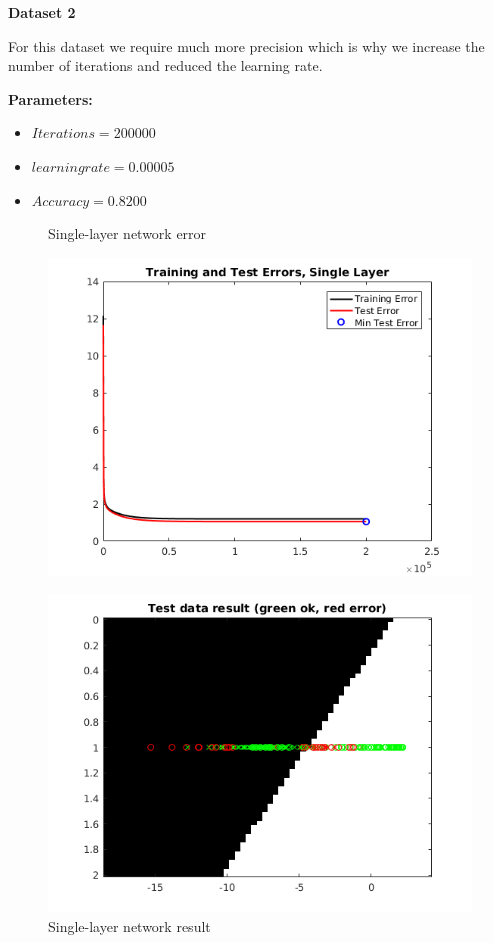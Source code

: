 \documentclass[a4paper,12pt]{article}
\begin{document}
\noindent \textbf{Dataset 2}

For this dataset we require much more precision which is why we increase the number of iterations and reduced the learning rate.

\textbf{Parameters:}
\begin{itemize}
\item $Iterations = 200000$
\item $learning rate = 0.00005$
\item $Accuracy = 0.8200$
\end{itemize}

\begin{figure}[H]
\centering
  \begin{minipage}[]{0.49\textwidth}
  \caption{Single-layer network error}\label{fig:single_2_error}
  \includegraphics[width=\textwidth]{figures/single_2_error.png}
  \end{minipage}
  \begin{minipage}[]{0.49\textwidth}
  \caption{Single-layer network result}\label{fig:single_2_test}
  \includegraphics[width=\textwidth]{figures/single_2_test.png}
  \end{minipage}
\end{figure}
\end{document}
